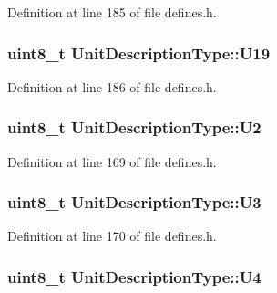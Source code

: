 Definition at line 185 of file defines.\+h.

\subsubsection[{\texorpdfstring{U19}{U19}}]{\setlength{\rightskip}{0pt plus 5cm}uint8\+\_\+t Unit\+Description\+Type\+::\+U19}\hypertarget{structUnitDescriptionType_aeb14175b8f3acc759a3a3c0148a38123}{}\label{structUnitDescriptionType_aeb14175b8f3acc759a3a3c0148a38123}


Definition at line 186 of file defines.\+h.

\subsubsection[{\texorpdfstring{U2}{U2}}]{\setlength{\rightskip}{0pt plus 5cm}uint8\+\_\+t Unit\+Description\+Type\+::\+U2}\hypertarget{structUnitDescriptionType_ac6fad13d43afdf94c34b6f3a304a7005}{}\label{structUnitDescriptionType_ac6fad13d43afdf94c34b6f3a304a7005}


Definition at line 169 of file defines.\+h.

\subsubsection[{\texorpdfstring{U3}{U3}}]{\setlength{\rightskip}{0pt plus 5cm}uint8\+\_\+t Unit\+Description\+Type\+::\+U3}\hypertarget{structUnitDescriptionType_ab3e64923796c7974898273319bc0356a}{}\label{structUnitDescriptionType_ab3e64923796c7974898273319bc0356a}


Definition at line 170 of file defines.\+h.

\subsubsection[{\texorpdfstring{U4}{U4}}]{\setlength{\rightskip}{0pt plus 5cm}uint8\+\_\+t Unit\+Description\+Type\+::\+U4}\hypertarget{structUnitDescriptionType_af67d7027e3b93c0d1c6c9e316c31da52}{}\label{structUnitDescriptionType_af67d7027e3b93c0d1c6c9e316c31da52}


